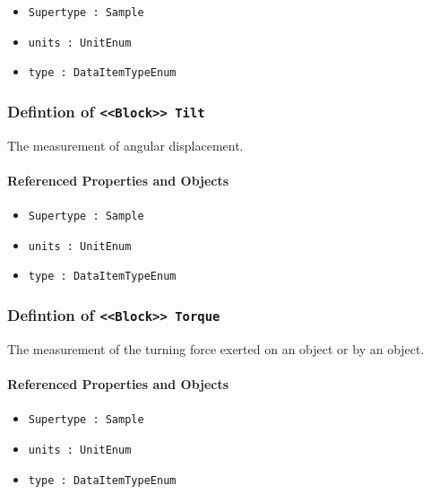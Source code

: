 \begin{itemize}
\item \texttt{Supertype : Sample}

\item \texttt{units : UnitEnum}

\item \texttt{type : DataItemTypeEnum}

\end{itemize}
\FloatBarrier
\subsubsection{Defintion of \texttt{<<Block>> Tilt}}
  \label{type:Tilt}

\FloatBarrier

The measurement of angular displacement.

\FloatBarrier
\paragraph{Referenced Properties and Objects}

\begin{itemize}
\item \texttt{Supertype : Sample}

\item \texttt{units : UnitEnum}

\item \texttt{type : DataItemTypeEnum}

\end{itemize}
\FloatBarrier
\subsubsection{Defintion of \texttt{<<Block>> Torque}}
  \label{type:Torque}

\FloatBarrier

The measurement of the turning force exerted on an object or by an object.

\FloatBarrier
\paragraph{Referenced Properties and Objects}

\begin{itemize}
\item \texttt{Supertype : Sample}

\item \texttt{units : UnitEnum}

\item \texttt{type : DataItemTypeEnum}

\end{itemize}
\FloatBarrier
